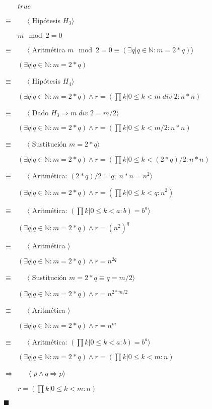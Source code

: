 \documentclass[hidelinks]{article}
\begin{document}
$\qquad true$\par
$\equiv \qquad \langle$ Hipótesis $H_3\rangle$\par
$\qquad m \mod 2 = 0$\par
$\equiv \qquad \langle$ Aritmética $m \mod 2 = 0 \equiv (\exists q| q \in \mathbb{N} : m = 2 * q)\rangle$\par
$\qquad (\exists q| q \in \mathbb{N} : m = 2 * q)$\par
$\equiv \qquad \langle$ Hipótesis $H_4\rangle$\par
$\qquad (\exists q| q \in \mathbb{N} : m = 2 * q) \land r = (\prod k | 0 \leq k < m \; div \; 2: n * n)$\par
$\equiv \qquad \langle$ Dado $H_3 \Rightarrow m \; div \; 2 = m / 2 \rangle$\par
$\qquad (\exists q| q \in \mathbb{N} : m = 2 * q) \land r = (\prod k | 0 \leq k < m / 2: n * n)$\par
$\equiv \qquad \langle$ Sustitución $ m = 2 * q \rangle$\par
$\qquad (\exists q| q \in \mathbb{N} : m = 2 * q) \land r = (\prod k | 0 \leq k < (2 * q) / 2: n * n)$\par
$\equiv \qquad \langle$ Aritmética: $ (2 * q) / 2 = q; \; n * n = n^2 \rangle$\par
$\qquad (\exists q| q \in \mathbb{N} : m = 2 * q) \land r = (\prod k | 0 \leq k < q: n^2)$\par
$\equiv \qquad \langle$ Aritmética: $ (\prod k | 0 \leq k < a: b) = b^a \rangle$\par
$\qquad (\exists q| q \in \mathbb{N} : m = 2 * q) \land r = (n^2)^q$\par
$\equiv \qquad \langle$ Aritmética $ \rangle$\par
$\qquad (\exists q| q \in \mathbb{N} : m = 2 * q) \land r = n^{2q}$\par
$\equiv \qquad \langle$ Sustitución $ m = 2 * q \equiv q = m / 2 \rangle$\par
$\qquad (\exists q| q \in \mathbb{N} : m = 2 * q) \land r = n^{2*m/2}$\par
$\equiv \qquad \langle$ Aritmética $ \rangle$\par
$\qquad (\exists q| q \in \mathbb{N} : m = 2 * q) \land r = n^m$\par
$\equiv \qquad \langle$ Aritmética: $ (\prod k | 0 \leq k < a: b) = b^a \rangle$\par
$\qquad (\exists q| q \in \mathbb{N} : m = 2 * q) \land r = (\prod k | 0 \leq k < m: n)$\par
$\Rightarrow \qquad \langle$ $ p \land q \Rightarrow p\rangle$\par
$\qquad r = (\prod k | 0 \leq k < m: n)$\par
$\blacksquare$\par
\end{document}
